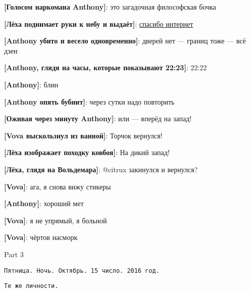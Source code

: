\begin{flushleft}
\textbf{[Голосом наркомана Anthony]}: это загадочная философская бочка

\textbf{[Лёха поднимает руки к небу и выдаёт]}: \href{http://sad.co.ua/wp-content/uploads/2014/07/dveri-bochka.png}{спасибо интернет}

\textbf{[Anthony убито и весело одновременно]}: дверей нет --- границ тоже --- всё дзен

\textbf{[Anthony, глядя на часы, которые показывают 22:23]}: 22:22

\textbf{[Anthony]}: блин

\textbf{[Anthony опять бубнит]}: через сутки надо повторить

\textbf{[Оживая через минуту Anthony]}: или --- вперёд на запад!

\textbf{[Vova выскользнул из ванной]}: Торчок вернулся!

\textbf{[Лёха изображает походку ковбоя]}: На дикий запад!

\textbf{[Лёха, глядя на Вольдемара]}: @citrux закинулся и вернулся?

\textbf{[Vova]}: ага, я снова вижу стикеры

\textbf{[Anthony]}: хороший мет

\textbf{[Vova]}: я не упрямый, я больной

\textbf{[Vova]}: чёртов насморк
\end{flushleft}

\begin{center}
    \large Part 3
\end{center}

{\small\texttt{Пятница. Ночь. Октябрь. 15 число. 2016 год.}}

{\small\texttt{Те же личности.}}

